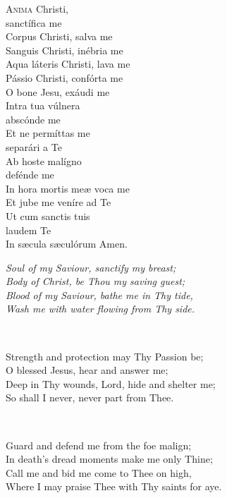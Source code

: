 
\begin{minipage}{0.4\textwidth}
\lettrine{A}{nima} Christi,\\
	sanctífica me\\
Corpus Christi, salva me\\
Sanguis Christi, inébria me\\
Aqua láteris Christi,
lava me\\
Pássio Christi, confórta me\\
O bone Jesu, exáudi me\\
Intra tua vúlnera\\
\phantom{tab} abscónde me\\
Et ne permíttas me\\
\phantom{tab} separári a Te\\
Ab hoste malígno\\
\phantom{tab} defénde me\\
In hora mortis meæ
	voca me\\
Et jube me veníre ad Te\\
Ut cum sanctis tuis\\
\phantom{tab} laudem Te\\
In sæcula sæculórum
Amen.
\end{minipage}
\hskip3pt
\begin{minipage}{0.6\textwidth}
	\itshape
Soul of my Saviour, sanctify my breast;\\
Body of Christ, be Thou my saving guest;\\
Blood of my Saviour, bathe me in Thy tide,\\
Wash me with water flowing from Thy side.

~

Strength and protection may Thy Passion
be;\\
O blessed Jesus, hear and answer me;\\
Deep in Thy wounds, Lord, hide and
shelter me;\\
So shall I never, never part from Thee.

~

Guard and defend me from the foe
malign;\\
In death’s dread moments make me only
Thine;\\
Call me and bid me come to Thee on high,\\
Where I may praise Thee with Thy saints
for aye.

~

\end{minipage}
